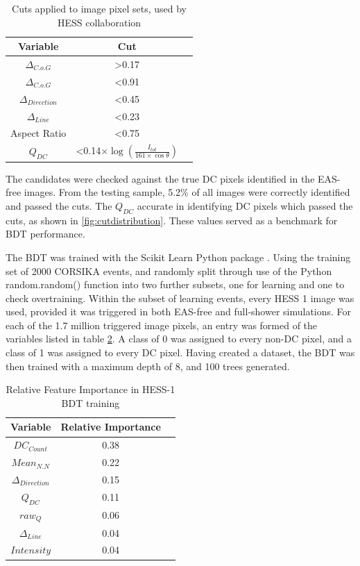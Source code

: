 \documentclass[]{article}
\begin{document}
\begin{table}[h!]
  \centering
  \caption{Cuts applied to image pixel sets, used by HESS collaboration \cite{hess07}}
  \label{tab:table1}
  \begin{tabular}{ccc}
    \toprule
    Variable & Cut\\
    \midrule
     $ \Delta_{C.o.G}$ & \textgreater 0.17 \\
     $ \Delta_{C.o.G}$ & \textless 0.91 \\
     $\Delta_{Direction}$ & \textless 0.45 \\
     $\Delta_{Line}$ & \textless 0.23 \\
     Aspect Ratio & \textless 0.75 \\
     $Q_{DC}$ & \textless 0.14$ \times \log(\frac{I_{tot}}{161 \times \cos \theta})$ \\
    \bottomrule
  \end{tabular}
\end{table}

The candidates were checked against the true DC pixels identified in the EAS-free images. From the testing sample, 5.2\% of all images were correctly identified and passed the cuts. The $Q_{DC}$ accurate in identifying DC pixels which passed the cuts, as shown in \ref{fig:cutdistribution}. These values served as a benchmark for BDT performance. 

The BDT was trained with the Scikit Learn Python package \cite{scikit-learn}. Using the training set of 2000 CORSIKA events, and randomly split through use of the Python random.random() function into two further subsets, one for learning and one to check overtraining. Within the subset of learning events, every HESS 1 image was used, provided it was triggered in both EAS-free and full-shower simulations. For each of the 1.7 million triggered image pixels, an entry was formed of the variables listed in table \ref{tab:table2}. A class of 0 was assigned to every non-DC pixel, and a class of 1 was assigned to every DC pixel. Having created a dataset, the BDT was then trained with a maximum depth of 8, and 100 trees generated.

\begin{table}[h!]
  \centering
  \caption{Relative Feature Importance in HESS-1 BDT training}
  \label{tab:table2}
  \begin{tabular}{ccc}
    \toprule
    Variable & Relative Importance\\
    \midrule
    $DC_{Count}$ & 0.38\\
    $Mean_{N.N}$ & 0.22\\
    $\Delta_{Direction}$ & 0.15\\
    $Q_{DC}$ & 0.11\\
    $raw_{Q}$ & 0.06\\
    $\Delta_{Line}$ & 0.04\\
    $Intensity$ & 0.04\\
    \bottomrule
  \end{tabular}
\end{table}
\end{document}
